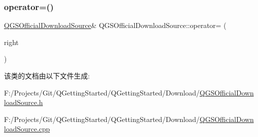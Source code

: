 \mbox{\label{class_q_g_s_official_download_source_a03ede2c62cf5202cf55c5a4cbd07cd31}} 
\subsubsection{\texorpdfstring{operator=()}{operator=()}\hspace{0.1cm}{\footnotesize\ttfamily [2/2]}}
{\footnotesize\ttfamily \mbox{\hyperlink{class_q_g_s_official_download_source}{Q\+G\+S\+Official\+Download\+Source}}\& Q\+G\+S\+Official\+Download\+Source\+::operator= (\begin{DoxyParamCaption}\item[{\mbox{\hyperlink{class_q_g_s_official_download_source}{Q\+G\+S\+Official\+Download\+Source}} \&\&}]{right }\end{DoxyParamCaption})\hspace{0.3cm}{\ttfamily [delete]}}



该类的文档由以下文件生成\+:\begin{DoxyCompactItemize}
\item 
F\+:/\+Projects/\+Git/\+Q\+Getting\+Started/\+Q\+Getting\+Started/\+Download/\mbox{\hyperlink{_q_g_s_official_download_source_8h}{Q\+G\+S\+Official\+Download\+Source.\+h}}\item 
F\+:/\+Projects/\+Git/\+Q\+Getting\+Started/\+Q\+Getting\+Started/\+Download/\mbox{\hyperlink{_q_g_s_official_download_source_8cpp}{Q\+G\+S\+Official\+Download\+Source.\+cpp}}\end{DoxyCompactItemize}
